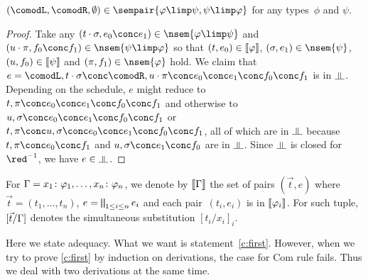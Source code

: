 \begin{proposition}
 \label{comod-type}
 $(\comodL,\comodR,\emptyset)\in\sempair{\phi\limp\psi,\psi\limp\phi}$
 for any types~$\phi$ and $\psi$.
\end{proposition}
\begin{proof}
 Take any $(t\cdot\sigma,e_{0}\conc e_{1})\in\nsem{\phi\limp\psi}$
 and $(u\cdot\pi,f_{0}\conc f_{1})\in\nsem{\psi\limp\phi}$ so that
 $(t, e_{0})\in\llbracket{\varphi}\rrbracket$, $(\sigma,e_{1})\in\nsem{\psi}$,
 $(u, f_{0})\in\llbracket{\psi}\rrbracket$ and $(\pi,f_{1})\in\nsem{\phi}$ hold.
 We claim that $e=\comodL,t\cdot\sigma\conc\comodR,u\cdot\pi\conc
 e_{0}\conc e_{1}\conc f_{0}\conc f_{1}$ is in
 $\bbot$.
 Depending on the schedule, $e$ might reduce to
 $ t,\pi\conc e_{0}\conc e_{1}\conc f_{0}\conc f_{1}$ and otherwise to
 $ u,\sigma\conc e_{0}\conc e_{1}\conc f_{0}\conc f_{1}$ or
 $ t,\pi\conc u,\sigma\conc e_{0}\conc e_{1}\conc f_{0}\conc f_{1}$,
 all of which are in $\bbot$ because
 $t,\pi\conc e_{0}\conc f_{1}$ and
 $u,\sigma\conc e_{1}\conc f_{0}$ are in $\bbot$.
 Since $\bbot$ is closed for $\red^{-1}$,
 we have $e\in\bbot$.
\end{proof}

For $\Gamma = {x_1} \colon{\varphi_1},\ldots,{x_n} \colon{\varphi_n}$,
we denote by $\llbracket{\Gamma}\rrbracket$ the set of pairs $(\vec t,e)$ where
$\vec{t} = (t_1,\dots,t_n)$, $e = \bigparallel_{1\le i\le n} e_i$
 and each pair~$(t_i, e_i)$ is in $\llbracket{\varphi_i}\rrbracket$.
For such tuple, $[\vec{t}/\Gamma]$ denotes the simultaneous substitution
$[t_i/x_i]_{i}$.

Here we state adequacy.  What we want is statement~\ref{c:first}.
However, when we try to prove \ref{c:first} by induction on derivations,
the case for Com rule fails.  Thus we deal with two derivations at the
same time.

